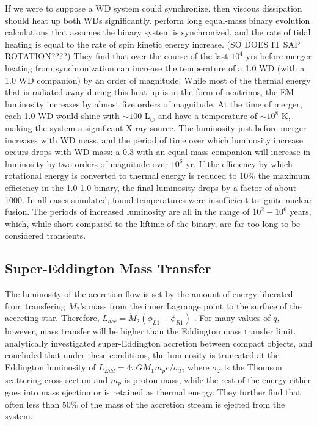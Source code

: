 If we were to suppose a WD system could synchronize, then viscous dissipation should heat up both WDs significantly.  \cite{ibentf98} perform long equal-mass binary evolution calculations that assumes the binary system is synchronized, and the rate of tidal heating is equal to the rate of spin kinetic energy increase. (SO DOES IT SAP ROTATION????)  They find that over the course of the last $10^4$ yrs before merger heating from synchronization can increase the temperature of a 1.0 {\Msun} WD (with a 1.0 {\Msun} WD companion) by an order of magnitude.  While most of the thermal energy that is radiated away during this heat-up is in the form of neutrinos, the EM luminosity increases by almost five orders of magnitude.  At the time of merger, each 1.0 {\Msun} WD would shine with $\sim 100$ L$_{\odot}$ and have a temperature of $\sim 10^8$ K, making the system a significant X-ray source.  The luminosity just before merger increases with WD mass, and the period of time over which luminosity increase occurs drops with WD mass: a 0.3 {\Msun} with an equal-mass companion will increase in luminosity by two orders of magnitude over $10^6$ yr.  If the efficiency by which rotational energy is converted to thermal energy is reduced to 10\% the maximum efficiency in the 1.0-1.0 {\Msun} binary, the final luminosity drops by a factor of about 1000.  In all cases simulated, \citeauthor{ibentf98} found temperatures were insufficient to ignite nuclear fusion.  The periods of increased luminosity are all in the range of $10^2 - 10^6$ years, which, while short compared to the liftime of the binary, are far too long to be considered transients.

\subsection{Super-Eddington Mass Transfer}
\label{ssec:super-eddingtonmasstransfer}

The luminosity of the accretion flow is set by the amount of energy liberated from transfering $M_2$'s mass from the inner Lagrange point to the surface of the accreting star.  Therefore, $L_{acc} = \dot{M}_2(\phi_{L1} - \phi_{R1})$  \citep{hanw99}.  For many values of $q$, however, mass transfer will be higher than the Eddington mass transfer limit.  \citeauthor{hanw99} analytically investigated super-Eddington accretion between compact objects, and concluded that under these conditions, the luminosity is truncated at the Eddington luminosity of $L_{Edd} = 4{\pi}GM_1m_pc/\sigma_T$, where $\sigma_T$ is the Thomson scattering cross-section and $m_p$ is proton mass, while the rest of the energy either goes into mass ejection or is retained as thermal energy.  They further find that often less than 50\% of the mass of the accretion stream is ejected from the system.

